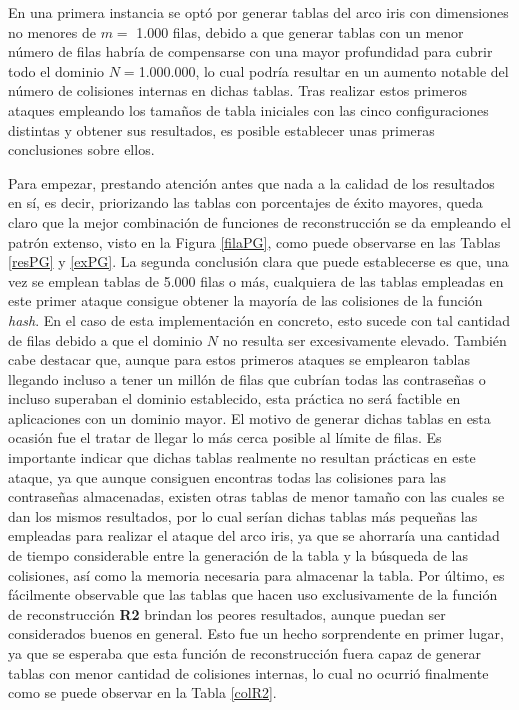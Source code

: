 \documentclass[12pt,spanish,listoffigures,listoftables,listofalgorithms]{tfgetsinf}
\newcommand{\hash}{\textit{hash}}
\begin{document}
En una primera instancia se optó por generar tablas del arco iris con dimensiones no menores de $m =$ 1.000 filas, debido a que generar tablas con un menor número de filas habría de compensarse con una mayor profundidad para cubrir todo el dominio $N = $1.000.000, lo cual podría resultar en un aumento notable del número de colisiones internas en dichas tablas. Tras realizar estos primeros ataques empleando los tamaños de tabla iniciales con las cinco configuraciones distintas y obtener sus resultados, es posible establecer unas primeras conclusiones sobre ellos.

Para empezar, prestando atención antes que nada a la calidad de los resultados en sí, es decir, priorizando las tablas con porcentajes de éxito mayores, queda claro que la mejor combinación de funciones de reconstrucción se da empleando el patrón extenso, visto en la Figura \ref{filaPG}, como puede observarse en las Tablas \ref{resPG} y \ref{exPG}. La segunda conclusión clara que puede establecerse es que, una vez se emplean tablas de 5.000 filas o más, cualquiera de las tablas empleadas en este primer ataque consigue obtener la mayoría de las colisiones de la función \hash. En el caso de esta implementación en concreto, esto sucede con tal cantidad de filas debido a que el dominio $N$ no resulta ser excesivamente elevado. También cabe destacar que, aunque para estos primeros ataques se emplearon tablas llegando incluso a tener un millón de filas que cubrían todas las contraseñas o incluso superaban el dominio establecido, esta práctica no será factible en aplicaciones con un dominio mayor. El motivo de generar dichas tablas en esta ocasión fue el tratar de llegar lo más cerca posible al límite de filas. Es importante indicar que dichas tablas realmente no resultan prácticas en este ataque, ya que aunque consiguen encontras todas las colisiones para las contraseñas almacenadas, existen otras tablas de menor tamaño con las cuales se dan los mismos resultados, por lo cual serían dichas tablas más pequeñas las empleadas para realizar el ataque del arco iris, ya que se ahorraría una cantidad de tiempo considerable entre la generación de la tabla y la búsqueda de las colisiones, así como la memoria necesaria para almacenar la tabla. Por último, es fácilmente observable que las tablas que hacen uso exclusivamente de la función de reconstrucción \textbf{R2} brindan los peores resultados, aunque puedan ser considerados buenos en general. Esto fue un hecho sorprendente en primer lugar, ya que se esperaba que esta función de reconstrucción fuera capaz de generar tablas con menor cantidad de colisiones internas, lo cual no ocurrió finalmente como se puede observar en la Tabla \ref{colR2}.
\end{document}
